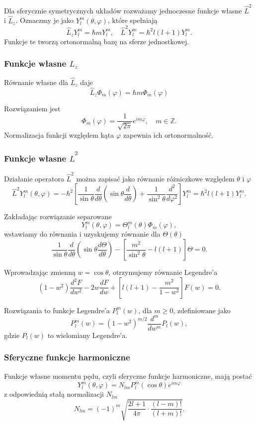 Dla sferycznie symetrycznych układów rozważamy jednoczesne funkcje własne $\hat{L}^2$ i $\hat{L}_z$. Oznaczmy je jako $Y_{l}^{m}(\theta, \varphi)$, które spełniają
$$
\hat{L}_z Y_{l}^{m} = \hbar m Y_{l}^{m}, \quad \hat{L}^2 Y_{l}^{m} = \hbar^2 l(l+1) Y_{l}^{m}.
$$
Funkcje te tworzą ortonormalną bazę na sferze jednostkowej.

\subsubsection*{Funkcje własne $\hat{L}_z$}
Równanie własne dla $\hat{L}_z$ daje
$$
\hat{L}_z \Phi_m(\varphi) = \hbar m \Phi_m(\varphi)
$$

Rozwiązaniem jest
$$
\Phi_m(\varphi) = \frac{1}{\sqrt{2\pi}} e^{im\varphi}, \quad m \in \mathbb{Z}.
$$
Normalizacja funkcji względem kąta $\varphi$ zapewnia ich ortonormalność.

\subsubsection*{Funkcje własne $\hat{L}^2$}
Działanie operatora $\hat{L}^2$ można zapisać jako równanie różniczkowe względem $\theta$ i $\varphi$
$$
\hat{L}^2 Y_l^m(\theta, \varphi) = -\hbar^2 \left[ \frac{1}{\sin\theta} \frac{d}{d\theta} \left( \sin\theta \frac{d}{d\theta} \right) + \frac{1}{\sin^2\theta} \frac{d^2}{d\varphi^2} \right] Y_l^m = \hbar^2 l(l+1) Y_l^m.
$$

Zakładając rozwiązanie separowane
$$
Y_l^m(\theta, \varphi) = \Theta_l^m(\theta) \Phi_m(\varphi),
$$
wstawiamy do równania i uzyskujemy równanie dla $\Theta(\theta)$
$$
\frac{1}{\sin\theta} \frac{d}{d\theta} \left( \sin\theta \frac{d\Theta}{d\theta} \right) - \left[ \frac{m^2}{\sin^2\theta} - l(l+1) \right] \Theta = 0.
$$

Wprowadzając zmienną $w = \cos\theta$, otrzymujemy równanie Legendre'a
$$
(1 - w^2) \frac{d^2 F}{dw^2} - 2w \frac{dF}{dw} + \left[ l(l+1) - \frac{m^2}{1 - w^2} \right] F(w) = 0.
$$

Rozwiązania to funkcje Legendre'a $P_l^m(w)$, dla $m \geq 0$, zdefiniowane jako
$$
P_l^m(w) = (1 - w^2)^{m/2} \frac{d^m}{dw^m} P_l(w),
$$
gdzie $P_l(w)$ to wielomiany Legendre'a.

\subsubsection*{Sferyczne funkcje harmoniczne}
Funkcje własne momentu pędu, czyli sferyczne funkcje harmoniczne, mają postać
$$
Y_l^m(\theta, \varphi) = N_{lm} P_l^m(\cos\theta) e^{im\varphi}
$$
z odpowiednią stałą normalizacji $N_{lm}$
$$
N_{lm} = (-1)^m \sqrt{\frac{2l + 1}{4\pi} \cdot \frac{(l - m)!}{(l + m)!}}.
$$

